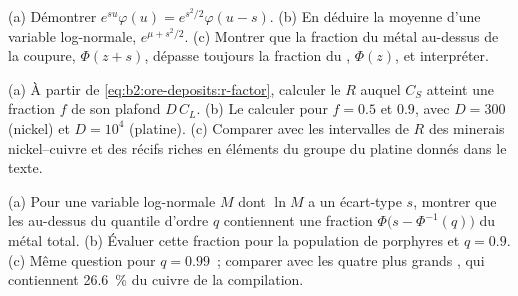\begin{exercise}[$\star\star\star$]\label{exo:b2:ore-deposits:10}
(a) Démontrer $e^{su}\varphi(u) = e^{s^2/2}\varphi(u - s)$. (b) En déduire la moyenne d'une variable
log-normale, $e^{\mu + s^2/2}$. (c) Montrer que la fraction du métal au-dessus de la
coupure, $\Phi(z + s)$, dépasse toujours la fraction du , $\Phi(z)$, et interpréter.
\end{exercise}

\begin{exercise}[$\star\star\star$]\label{exo:b2:ore-deposits:11}
(a) À partir de \eqref{eq:b2:ore-deposits:r-factor}, calculer le $R$ auquel $C_S$ atteint une fraction $f$
de son plafond $D\,C_L$. (b) Le calculer pour $f = 0.5$ et $0.9$, avec $D = 300$ (nickel) et $D =
10^4$ (platine). (c) Comparer avec les intervalles de $R$ des minerais nickel--cuivre et des récifs riches en éléments
du groupe du platine donnés dans le texte.
\end{exercise}

\begin{exercise}[$\star\star\star$]\label{exo:b2:ore-deposits:12}
(a) Pour une variable log-normale $M$ dont $\ln M$ a un écart-type $s$, montrer que les  au-dessus
du quantile d'ordre $q$ contiennent une fraction $\Phi\bigl(s - \Phi^{-1}(q)\bigr)$ du métal total. (b) Évaluer
cette fraction pour la population de porphyres et $q = 0.9$. (c) Même question pour $q = 0.99$~; comparer
avec les quatre plus grands , qui contiennent \qty{26.6}{\percent} du cuivre de la compilation.
\end{exercise}

